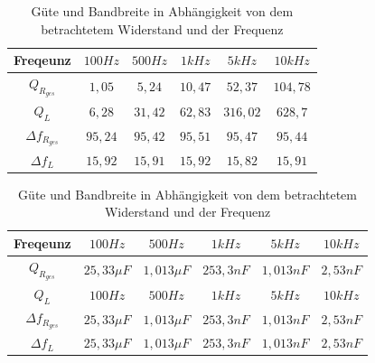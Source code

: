 \documentclass{article}
\begin{document}
\begin{table}[h]

\begin{center}

  \begin{tabular}{|c|c|c|c|c|c|}    
    \hline
    Freqeunz               & $100Hz$                   & $500Hz$                   & $1kHz$            & $5kHz$          & $10kHz$              \\
    \hline
    $Q_{R_{ges}}$              & $1,05$               & $5,24$                     & $10,47$            & $52,37$           & $104,78$              \\
    \hline
    $Q_L$              & $6,28$                   & $31,42$                   & $62,83$            & $316,02$          & $628,7$              \\
    \hline
    $\Delta f_{R_{ges}}$              & $95,24$                      & $95,42$                     & $95,51$            & $95,47$           & $95,44$              \\
    \hline
    $\Delta f_L$              & $15,92$                      & $15,91$                     & $15,92$            & $15,82$           & $15,91$              \\
    \hline
  \end{tabular}

    \begin{tabular}{|c|c|c|c|c|c|}
      \hline
      Freqeunz             & $100 Hz$     & $500Hz$      & $1kHz$    & $5kHz$    & $10kHz$  \\
      \hline
      $Q_{R_{ges}}$        & $25,33\mu F$ & $1,013\mu F$ & $253,3nF$ & $1,013nF$ & $2,53nF$ \\
      \hline
      $Q_L$                & $100 Hz$     & $500Hz$      & $1kHz$    & $5kHz$    & $10kHz$  \\
      \hline
      $\Delta f_{R_{ges}}$ & $25,33\mu F$ & $1,013\mu F$ & $253,3nF$ & $1,013nF$ & $2,53nF$ \\
      \hline
      $\Delta f_L$         & $25,33\mu F$ & $1,013\mu F$ & $253,3nF$ & $1,013nF$ & $2,53nF$ \\
      \hline
    \end{tabular}
    \caption{Güte und Bandbreite in Abhängigkeit von dem betrachtetem Widerstand und der Frequenz}
    \label{tab:cGB}
  \end{center}
\end{table}



\newpage
\end{document}
